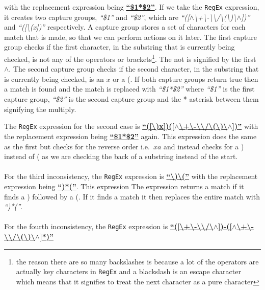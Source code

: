 \documentclass[../../../../../main.tex]{subfiles}
\begin{document}
with the replacement expression being \textbf{\underline{``\$1*\$2''}}. If we take the \texttt{RegEx} expression, it creates two capture groups, \textit{``\$1''} and \textit{``\$2''}, which are \textit{``([$\wedge$\textbackslash+\textbackslash-\textbackslash*\textbackslash/\textbackslash(\textbackslash)\textbackslash$\wedge$])''} and \textit{``([\textbackslash(x])''} respectively. A capture group stores a set of characters for each match that is made, so that we can perform actions on it later. The first capture group checks if the first character, in the substring that is currently being checked, is not any of the operators or brackets\footnote{the reason there are so many backslashes is because a lot of the operators are actually key characters in \texttt{RegEx} and a blackslash is an escape character which means that it signifies to treat the next character as a pure character}. The not is signified by the first $\wedge$. The second capture group checks if the second character, in the substring that is currently being checked, is an $x$ or a (. If both capture groups return true then a match is found and the match is replaced with \textit{``\$1*\$2''} where \textit{``\$1''} is the first capture group, \textit{``\$2''} is the second capture group and the * asterisk between them signifying the multiply.\par
The \texttt{RegEx} expression for the second case is
\textbf{\underline{``([\textbackslash)x])([$\wedge$\textbackslash+\textbackslash-\textbackslash*\textbackslash/\textbackslash(\textbackslash)\textbackslash$\wedge$])''}}
with the replacement expression being \textbf{\underline{``\$1*\$2''}} again. This expression does the same as the first but checks for the reverse order i.e.\ $xa$ and instead checks for a ) instead of ( as we are checking the back of a substring instead of the start.\\ \\
For the third inconsistency, the \texttt{RegEx} expression is
\textbf{\underline{``\textbackslash)\textbackslash(''}}
with the replacement expression being \textbf{\underline{``)*(''}}. This expression The expression returns a match if it finds a ) followed by a (. If it finds a match it then replaces the entire match with \textit{``)*(''}.\\ \\
For the fourth inconsistency, the \texttt{RegEx} expression is
\textbf{\underline{``([\textbackslash+\textbackslash-\textbackslash*\textbackslash/\textbackslash$\wedge$])-([$\wedge$\textbackslash+\textbackslash-\textbackslash*\textbackslash/\textbackslash(\textbackslash)\textbackslash$\wedge$]*)''}}
\end{document}
